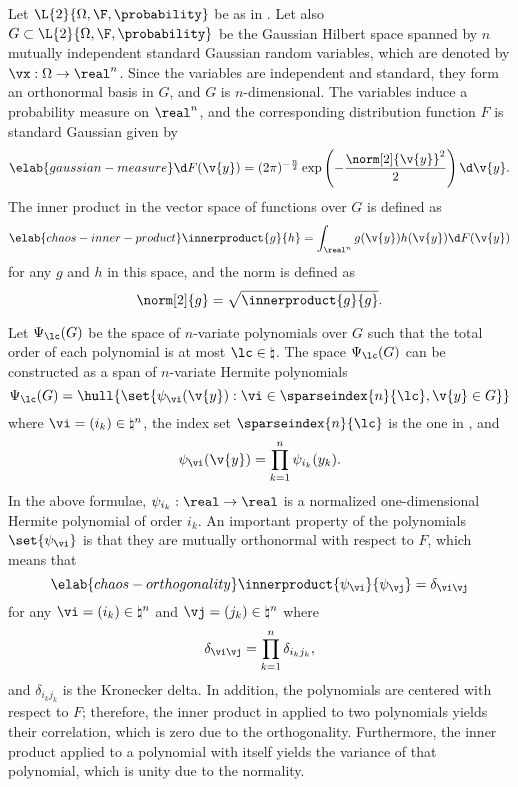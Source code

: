 Let $\L{2}{\Omega, \F, \probability}$ be as in .
Let also $G \subset \L{2}{\Omega, \F, \probability}$ be the Gaussian Hilbert
space \cite{janson1997} spanned by $n$ mutually independent standard Gaussian
random variables, which are denoted by $\vx: \Omega \to \real^n$. Since the
variables are independent and standard, they form an orthonormal basis in $G$,
and $G$ is $n$-dimensional. The variables induce a probability measure on
$\real^n$, and the corresponding distribution function $F$ is standard Gaussian
given by
\begin{equation} \elab{gaussian-measure}
  \d F(\v{y}) = (2 \pi)^{-\frac{n}{2}} \exp\left(-\frac{\norm[2]{\v{y}}^2}{2}\right) \d \v{y}.
\end{equation}
The inner product in the vector space of functions over $G$ is defined as
\begin{equation} \elab{chaos-inner-product}
  \innerproduct{g}{h} = \int_{\real^n} g(\v{y}) h(\v{y}) \d F(\v{y})
\end{equation}
for any $g$ and $h$ in this space, and the norm is defined as
\[
  \norm[2]{g} = \sqrt{\innerproduct{g}{g}}.
\]

Let $\Psi_\lc(G)$ be the space of $n$-variate polynomials over $G$ such that the
total order of each polynomial is at most $\lc \in \natural$. The space
$\Psi_\lc(G)$ can be constructed as a span of $n$-variate Hermite polynomials
\cite{eldred2008, maitre2010}
\[
  \Psi_\lc(G) = \hull{\set{\psi_{\vi}(\v{y}): \vi \in \sparseindex{n}{\lc}, \v{y} \in G}}
\]
where $\vi = (i_k) \in \natural^n$, the index set $\sparseindex{n}{\lc}$ is the
one in , and
\[
  \psi_{\vi}(\v{y}) = \prod_{k = 1}^n \psi_{i_k}(y_k).
\]
In the above formulae, $\psi_{i_k}: \real \to \real$ is a normalized
one-dimensional Hermite polynomial of order $i_k$. An important property of the
polynomials $\set{\psi_{\vi}}$ is that they are mutually orthonormal with
respect to $F$, which means that
\begin{equation} \elab{chaos-orthogonality}
  \innerproduct{\psi_{\vi}}{\psi_{\vj}} = \delta_{\vi \vj}
\end{equation}
for any $\vi = (i_k) \in \natural^n$ and $\vj = (j_k) \in \natural^n$ where
\[
  \delta_{\vi \vj} = \prod_{k = 1}^n \delta_{i_k j_k},
\]
and $\delta_{i_k j_k}$ is the Kronecker delta. In addition, the polynomials are
centered with respect to $F$; therefore, the inner product in
 applied to two polynomials yields their correlation,
which is zero due to the orthogonality. Furthermore, the inner product applied
to a polynomial with itself yields the variance of that polynomial, which is
unity due to the normality.

